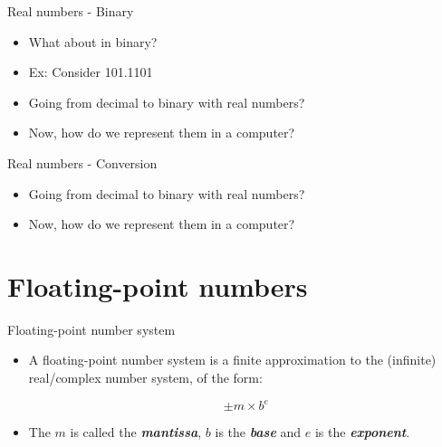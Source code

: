 \documentclass[12pt]{beamer}
\begin{document}
\begin{frame}{Real numbers - Binary}
\begin{itemize}
\item{What about in binary?}
\item{Ex: Consider 101.1101}
\vspace{3 in}
\item{Going from decimal to binary with real numbers?}
\vspace{1 in}
\item{Now, how do we represent them in a computer?}
\end{itemize}
\end{frame}

\begin{frame}{Real numbers - Conversion}
\begin{itemize}
\item{Going from decimal to binary with real numbers?}
\vspace{2 in}
\item{Now, how do we represent them in a computer?}
\end{itemize}
\end{frame}


\section{Floating-point numbers}

\begin{frame}{Floating-point number system} 
\begin{itemize}

\item{A floating-point number system is a finite approximation to the
(infinite) real/complex number system, of the form:

\begin{equation} 
\pm m \times b ^ e 
\end{equation}} 

\item{The $m$ is called the {\it \bf mantissa}, $b$ is the {\it \bf base} and
$e$ is the {\it \bf exponent}.}

\end{itemize}
\vspace{1 in}
\end{frame}
\end{document}
